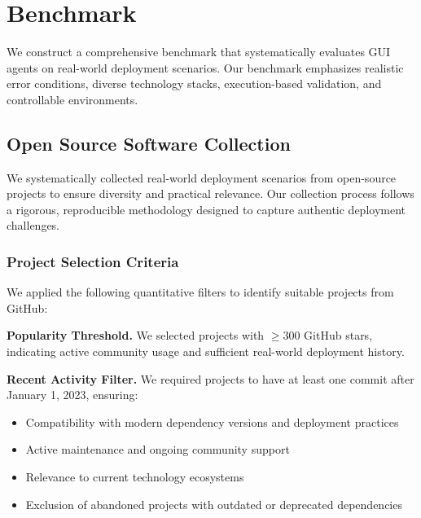 \section{Benchmark}\label{sec:benchmark}

We construct a comprehensive benchmark that systematically evaluates GUI agents on real-world deployment scenarios. Our benchmark emphasizes realistic error conditions, diverse technology stacks, execution-based validation, and controllable environments.

\subsection{Open Source Software Collection}\label{sec:data-collection}

We systematically collected real-world deployment scenarios from open-source projects to ensure diversity and practical relevance. Our collection process follows a rigorous, reproducible methodology designed to capture authentic deployment challenges.

\subsubsection{Project Selection Criteria}

We applied the following quantitative filters to identify suitable projects from GitHub:

\textbf{Popularity Threshold.} We selected projects with $\geq 300$ GitHub stars, indicating active community usage and sufficient real-world deployment history. 

\textbf{Recent Activity Filter.} We required projects to have at least one commit after January 1, 2023, ensuring:
\begin{itemize}
    \item Compatibility with modern dependency versions and deployment practices
    \item Active maintenance and ongoing community support
    \item Relevance to current technology ecosystems
    \item Exclusion of abandoned projects with outdated or deprecated dependencies
\end{itemize}

